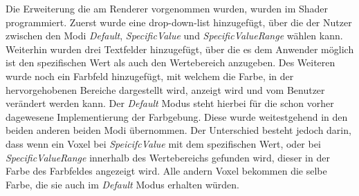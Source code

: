 Die Erweiterung die am Renderer vorgenommen wurden, wurden im Shader programmiert. Zuerst wurde eine drop-down-list hinzugefügt, über die der Nutzer zwischen den Modi \textit{Default}, \textit{SpecificValue} und \textit{SpecificValueRange} wählen kann.
\newline
Weiterhin wurden drei Textfelder hinzugefügt, über die es dem Anwender möglich ist den spezifischen Wert als auch den Wertebereich anzugeben. Des Weiteren wurde noch ein Farbfeld hinzugefügt, mit welchem die Farbe, in der hervorgehobenen Bereiche dargestellt wird, anzeigt wird und vom Benutzer verändert werden kann.
\newline
Der \textit{Default} Modus steht hierbei für die schon vorher dagewesene Implementierung der Farbgebung. Diese wurde weitestgehend in den beiden anderen beiden Modi übernommen. Der Unterschied besteht jedoch darin, dass wenn ein Voxel bei \textit{SpeicifcValue} mit dem spezifischen Wert, oder bei \textit{SpecificValueRange} innerhalb des Wertebereichs gefunden wird, dieser in der Farbe des Farbfeldes angezeigt wird. Alle andern Voxel bekommen die selbe Farbe, die sie auch im \textit{Default} Modus erhalten würden.























































